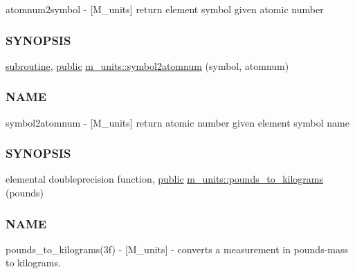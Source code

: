 \begin{DoxyCompactItemize}
\begin{DoxyCompactList}
atomnum2symbol -\/ \mbox{[}M\+\_\+units\mbox{]} return element symbol given atomic number \subsubsection*{S\+Y\+N\+O\+P\+S\+IS}\end{DoxyCompactList}\item 
\hyperlink{M__stopwatch_83_8txt_acfbcff50169d691ff02d4a123ed70482}{subroutine}, \hyperlink{M__stopwatch_83_8txt_a2f74811300c361e53b430611a7d1769f}{public} \hyperlink{namespacem__units_ad6861fff0b83942a7e6b35a274bf2e09}{m\+\_\+units\+::symbol2atomnum} (symbol, atomnum)
\begin{DoxyCompactList}\small\item\em \subsubsection*{N\+A\+ME}

symbol2atomnum -\/ \mbox{[}M\+\_\+units\mbox{]} return atomic number given element symbol name \subsubsection*{S\+Y\+N\+O\+P\+S\+IS}\end{DoxyCompactList}\item 
elemental doubleprecision function, \hyperlink{M__stopwatch_83_8txt_a2f74811300c361e53b430611a7d1769f}{public} \hyperlink{namespacem__units_a69c8b8d7b442cfbbe70fa384d96bebf0}{m\+\_\+units\+::pounds\+\_\+to\+\_\+kilograms} (pounds)
\begin{DoxyCompactList}\small\item\em \subsubsection*{N\+A\+ME}

pounds\+\_\+to\+\_\+kilograms(3f) -\/ \mbox{[}M\+\_\+units\mbox{]} -\/ converts a measurement in pounds-\/mass to kilograms. \end{DoxyCompactList}\end{DoxyCompactItemize}
